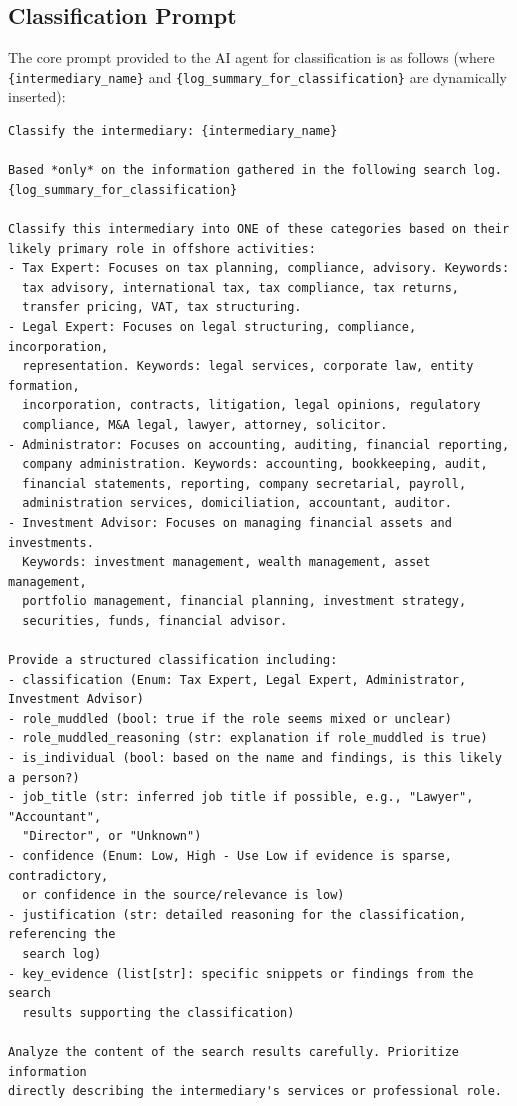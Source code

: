 \subsection*{Classification Prompt}
The core prompt provided to the AI agent for classification is as follows (where \texttt{\{intermediary\_name\}} and \texttt{\{log\_summary\_for\_classification\}} are dynamically inserted):
\begin{verbatim}
Classify the intermediary: {intermediary_name}

Based *only* on the information gathered in the following search log.
{log_summary_for_classification}

Classify this intermediary into ONE of these categories based on their
likely primary role in offshore activities:
- Tax Expert: Focuses on tax planning, compliance, advisory. Keywords:
  tax advisory, international tax, tax compliance, tax returns,
  transfer pricing, VAT, tax structuring.
- Legal Expert: Focuses on legal structuring, compliance, incorporation,
  representation. Keywords: legal services, corporate law, entity formation,
  incorporation, contracts, litigation, legal opinions, regulatory
  compliance, M&A legal, lawyer, attorney, solicitor.
- Administrator: Focuses on accounting, auditing, financial reporting,
  company administration. Keywords: accounting, bookkeeping, audit,
  financial statements, reporting, company secretarial, payroll,
  administration services, domiciliation, accountant, auditor.
- Investment Advisor: Focuses on managing financial assets and investments.
  Keywords: investment management, wealth management, asset management,
  portfolio management, financial planning, investment strategy,
  securities, funds, financial advisor.

Provide a structured classification including:
- classification (Enum: Tax Expert, Legal Expert, Administrator, Investment Advisor)
- role_muddled (bool: true if the role seems mixed or unclear)
- role_muddled_reasoning (str: explanation if role_muddled is true)
- is_individual (bool: based on the name and findings, is this likely a person?)
- job_title (str: inferred job title if possible, e.g., "Lawyer", "Accountant",
  "Director", or "Unknown")
- confidence (Enum: Low, High - Use Low if evidence is sparse, contradictory,
  or confidence in the source/relevance is low)
- justification (str: detailed reasoning for the classification, referencing the
  search log)
- key_evidence (list[str]: specific snippets or findings from the search
  results supporting the classification)

Analyze the content of the search results carefully. Prioritize information
directly describing the intermediary's services or professional role.
\end{verbatim}

